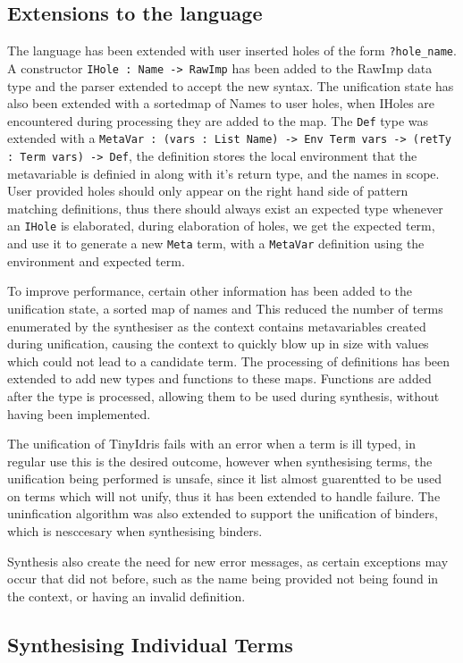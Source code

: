 \documentclass[a4paper]{article}
\begin{document}
\subsection{Extensions to the language}
\label{sec:org069ad48}
The language has been extended with user inserted holes of the form \texttt{?hole\_name}. 
A constructor \texttt{IHole : Name -> RawImp} has been added to the RawImp 
data type and the parser extended to accept the new syntax. The 
unification state has also been extended with a sortedmap of Names
to user holes, when IHoles are encountered during processing they are 
added to the map. The \texttt{Def} type was extended with a 
\texttt{MetaVar : (vars : List Name) -> Env Term vars -> (retTy : Term vars) -> Def}, 
the definition stores the local environment that the metavariable is 
definied in along with it's return type, and the names in scope.
User provided holes should only appear on the right hand side of 
pattern matching definitions, thus there should always exist an expected 
type whenever an \texttt{IHole} is elaborated, during elaboration of holes, we get
the expected term, and use it to generate a new \texttt{Meta} term, with a
\texttt{MetaVar} definition using the environment and expected term.

To improve performance, certain other information has been added to the unification state, a sorted map of names and 
This reduced the number of terms enumerated by the synthesiser as the 
context contains metavariables created during unification, causing the 
context to quickly blow up in size  with values which could not lead to 
a candidate term. 
The processing of definitions has been extended to add new types and functions to these maps. Functions are added 
after the type is processed, allowing them to be used during synthesis, without having been implemented. 

The unification of TinyIdris fails with an error when a term is ill typed, 
in regular use this is the desired outcome, however when synthesising 
terms, the unification being performed is unsafe, since it list almost
guarentted to be used on terms which will not unify, thus it has been 
extended to handle failure. The uninfication algorithm was also extended
to support the unification of binders, which is nesccesary when 
synthesising binders.  

Synthesis also create the need for new error messages, as certain exceptions
may occur that did not before, such as the name being provided not being found in the context, 
or having an invalid definition.
\subsection{Synthesising Individual Terms}
\label{sec:org262de8d}
\end{document}
